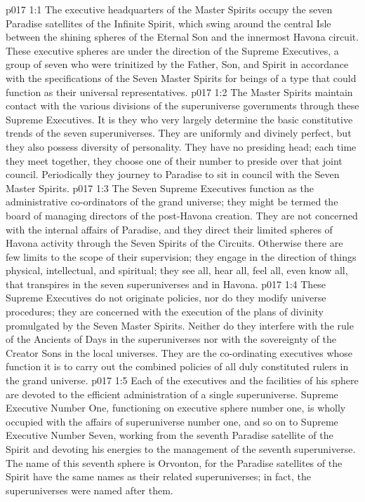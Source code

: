\vs p017 1:1 The executive headquarters of the Master Spirits occupy the seven Paradise satellites of the Infinite Spirit, which swing around the central Isle between the shining spheres of the Eternal Son and the innermost Havona circuit. These executive spheres are under the direction of the Supreme Executives, a group of seven who were trinitized by the Father, Son, and Spirit in accordance with the specifications of the Seven Master Spirits for beings of a type that could function as their universal representatives.
\vs p017 1:2 The Master Spirits maintain contact with the various divisions of the superuniverse governments through these Supreme Executives. It is they who very largely determine the basic constitutive trends of the seven superuniverses. They are uniformly and divinely perfect, but they also possess diversity of personality. They have no presiding head; each time they meet together, they choose one of their number to preside over that joint council. Periodically they journey to Paradise to sit in council with the Seven Master Spirits.
\pc \vs p017 1:3 The Seven Supreme Executives function as the administrative co\hyp{}ordinators of the grand universe; they might be termed the board of managing directors of the post\hyp{}Havona creation. They are not concerned with the internal affairs of Paradise, and they direct their limited spheres of Havona activity through the Seven Spirits of the Circuits. Otherwise there are few limits to the scope of their supervision; they engage in the direction of things physical, intellectual, and spiritual; they see all, hear all, feel all, even know all, that transpires in the seven superuniverses and in Havona.
\vs p017 1:4 These Supreme Executives do not originate policies, nor do they modify universe procedures; they are concerned with the execution of the plans of divinity promulgated by the Seven Master Spirits. Neither do they interfere with the rule of the Ancients of Days in the superuniverses nor with the sovereignty of the Creator Sons in the local universes. They are the co\hyp{}ordinating executives whose function it is to carry out the combined policies of all duly constituted rulers in the grand universe.
\vs p017 1:5 Each of the executives and the facilities of his sphere are devoted to the efficient administration of a single superuniverse. Supreme Executive Number One, functioning on executive sphere number one, is wholly occupied with the affairs of superuniverse number one, and so on to Supreme Executive Number Seven, working from the seventh Paradise satellite of the Spirit and devoting his energies to the management of the seventh superuniverse. The name of this seventh sphere is Orvonton, for the Paradise satellites of the Spirit have the same names as their related superuniverses; in fact, the superuniverses were named after them.
